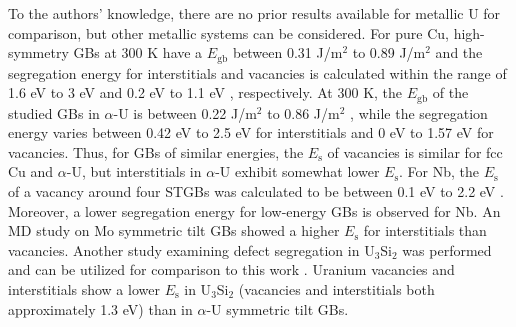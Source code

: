 \documentclass[review]{elsarticle}
\begin{document}
To the authors' knowledge, there are no prior results available for metallic U for comparison, but other metallic systems can be considered. For pure Cu, high-symmetry GBs at 300 K \cite{bai_cu_inter, bai_cu_gb_with_interstitial_inter} have a  $E_{\mathrm{gb}}$  between 0.31 J/m${^2}$ to 0.89 J/m${^2}$ and the segregation energy for interstitials and vacancies is calculated within the range of 1.6 eV to 3 eV and 0.2 eV to 1.1 eV \cite{bai_cu_inter}, respectively. At 300 K, the  $E_{\mathrm{gb}}$  of the studied GBs in $\alpha$-U is between 0.22 J/m${^2}$ to 0.86 J/m${^2}$ \cite{MAHBUBA2021153072}, while the segregation energy varies between 0.42 eV to 2.5 eV for interstitials and 0 eV to 1.57 eV for vacancies. Thus, for GBs of similar energies, the $E_{\mathrm{s}}$ of vacancies is similar for fcc Cu and $\alpha$-U, but interstitials in $\alpha$-U exhibit somewhat lower $E_{\mathrm{s}}$. For Nb, the $E_{\mathrm{s}}$ of a vacancy around four STGBs was calculated to be between 0.1 eV to 2.2 eV \cite{Popov2022}. Moreover, a lower segregation energy for low-energy GBs is observed for Nb. An MD study on Mo symmetric tilt GBs showed a higher $E_{\mathrm{s}}$ for interstitials than vacancies\cite{Novoselov2014}. Another study examining defect segregation in U$_3$Si$_2$ was performed and can be utilized for comparison to this work \cite{beelerUSi}. Uranium vacancies and interstitials show a lower $E_{\mathrm{s}}$ in U$_\mathrm{3}$Si$_\mathrm{2}$ (vacancies and interstitials both approximately 1.3 eV) than in $\alpha$-U symmetric tilt GBs. 

\end{document}
